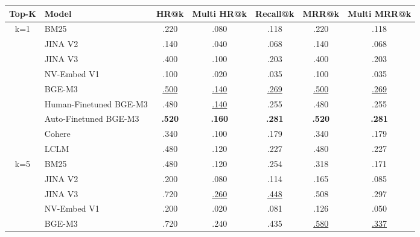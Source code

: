 \begin{table}[!ht]
\centering
\small
\begin{tabular}{@{}clccccc@{}}
\toprule
\textbf{Top-K} & \textbf{Model}                  & \textbf{HR@k}          & \textbf{Multi HR@k}    & \textbf{Recall@k}      & \textbf{MRR@k}         & \textbf{Multi MRR@k}   \\ \midrule
k=1   & BM25                   & .220          & .080          & .118          & .220          & .118          \\
      & JINA V2                & .140          & .040          & .068          & .140          & .068          \\
      & JINA V3                & .400          & .100          & .203          & .400          & .203          \\
      & NV-Embed V1            & .100          & .020          & .035          & .100          & .035          \\
      & BGE-M3                 & \underline{.500}    & \underline{.140}    & \underline{.269}    & \underline{.500}    & \underline{.269}    \\
      & Human-Finetuned BGE-M3 & .480          & \underline{.140}    & .255          & .480          & .255          \\
      & Auto-Finetuned BGE-M3  & \textbf{.520} & \textbf{.160} & \textbf{.281} & \textbf{.520} & \textbf{.281} \\
      & Cohere                 & .340          & .100          & .179          & .340          & .179          \\
      & LCLM                   & .480          & .120          & .227          & .480          & .227          \\ \midrule
k=5   & BM25                   & .480          & .120          & .254          & .318          & .171          \\
      & JINA V2                & .200          & .080          & .114          & .165          & .085          \\
      & JINA V3                & .720          & \underline{.260}    & \underline{.448}    & .508          & .297          \\
      & NV-Embed V1            & .200          & .020          & .081          & .126          & .050          \\
      & BGE-M3                 & .720          & .240          & .435          & \underline{.580}    & \underline{.337}    \\

\end{tabular}
\end{table}
